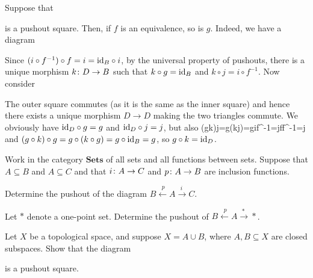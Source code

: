 \bs
Suppose that
\bse
{}
\ese
is a pushout square. Then, if $f$ is an equivalence, so is $g$. Indeed, we have a diagram
\bse
{}
\ese
Since $(i\circ f^{-1})\circ f=i=\mathrm{id}_B\circ i$, by the universal property of pushouts, there is a unique morphism $k\colon D\to B$ such that $k\circ g=\mathrm{id}_B$ and $k\circ j=i\circ f^{-1}$. Now consider
\bse
{}
\ese
The outer square commutes (as it is the same as the inner square) and hence there exists a unique morphism $D\to D$ making the two triangles commute. We obviously have $\mathrm{id}_D\circ g= g$ and $\mathrm{id}_D\circ j= j$, but also
\bse
(g\circ k)\circ j=g\circ (k\circ j)=g\circ i\circ f^{-1}=j\circ f\circ f^{-1}=j
\ese
and $(g\circ k)\circ g=g\circ(k\circ g)=g\circ \mathrm{id}_B=g$, so $g\circ k=\mathrm{id}_D$.  
\es

\bx
Work in the category $\mathbf{Sets}$ of all sets and all functions between sets. Suppose that $A \subseteq B$ and $A\subseteq C$ and that $i \colon A \to C$ and $p \colon A \to B$ are inclusion functions.
\ben[label=(\alph*)]
\item Determine the pushout of the diagram $B\xleftarrow{\ p} A\xrightarrow{i\ } C$.
\item Let $*$ denote a one-point set. Determine the pushout of $B\xleftarrow{\ p} A\xrightarrow{*\ }*$.
\een
\ex

\bs
\es

\bp
Let $X$ be a topological space, and suppose $X = A \cup B$, where $A,B \subseteq X$ are closed subspaces. Show that the diagram
\bse
{}
\ese
is a pushout square.
\ep

